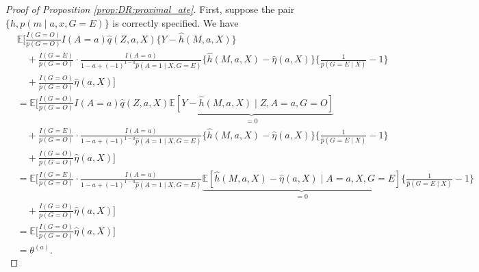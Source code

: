 \documentclass[10pt]{article}
\newcommand{\E}{\mathbb{E}}
\begin{document}
\begin{proof}[Proof of Proposition \ref{prop:DR:proximal_ate}]
First, suppose the pair $\{h,p(m\mid a,x,G=E)\}$ is correctly specified. We have
\begingroup
\allowdisplaybreaks
{\footnotesize \begin{align*}
&\E\Big[\frac{I(G=O)}{p(G=O)}I(A=a)\hat{q}(Z,a,X)\{Y-\hat{h}(M,a,X)\}\\
&\quad+\frac{I(G=E)}{p(G=O)}\cdot\frac{I(A=a)}{1-a+(-1)^{1-a}\hat{p}(A=1\mid X,G=E)}
\{\hat{h}(M,a,X)-\hat{\eta}(a,X)\}\{\frac{1}{\hat{p}(G=E\mid X)}-1\}\\
&\quad+\frac{I(G=O)}{p(G=O)}\hat{\eta}(a,X)\Big]\\
&=\E\Big[\frac{I(G=O)}{p(G=O)}I(A=a)\hat{q}(Z,a,X)\underbrace{\E[Y-\hat{h}(M,a,X)\mid Z,A=a,G=O]}_{=0}\\
&\quad+\frac{I(G=E)}{p(G=O)}\cdot\frac{I(A=a)}{1-a+(-1)^{1-a}\hat{p}(A=1\mid X,G=E)}
\{\hat{h}(M,a,X)-\hat{\eta}(a,X)\}\{\frac{1}{\hat{p}(G=E\mid X)}-1\}\\
&\quad+\frac{I(G=O)}{p(G=O)}\hat{\eta}(a,X)\Big]\\
&=\E\Big[
\frac{I(G=E)}{p(G=O)}\cdot\frac{I(A=a)}{1-a+(-1)^{1-a}\hat{p}(A=1\mid X,G=E)}
\underbrace{\E[\hat{h}(M,a,X)-\hat{\eta}(a,X)\mid A=a,X,G=E]}_{=0}\{\frac{1}{\hat{p}(G=E\mid X)}-1\}\\
&\quad+\frac{I(G=O)}{p(G=O)}\hat{\eta}(a,X)\Big]\\
&=\E\Big[
\frac{I(G=O)}{p(G=O)}\hat{\eta}(a,X)\Big]\\
&=\theta^{(a)}.
\end{align*}}
\endgroup


\end{proof}
\end{document}
